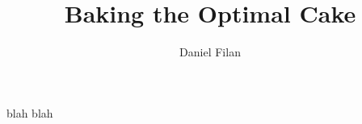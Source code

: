 \documentclass[12pt]{article}
\title{Baking the Optimal Cake}
\author{Daniel Filan}
\begin{document}

\maketitle

blah blah
\end{document}
